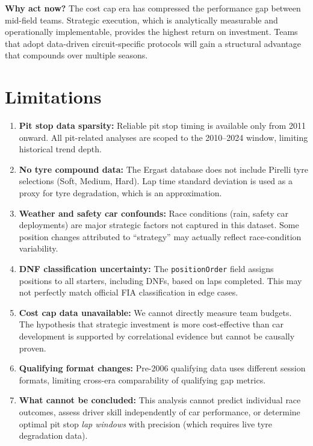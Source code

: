 \documentclass[12pt, a4paper]{article}
\begin{document}
\textbf{Why act now?} The cost cap era has compressed the performance gap between mid-field teams. Strategic execution, which is analytically measurable and operationally implementable, provides the highest return on investment. Teams that adopt data-driven circuit-specific protocols will gain a structural advantage that compounds over multiple seasons.

\newpage

\section{Limitations}

\begin{enumerate}
    \item \textbf{Pit stop data sparsity:} Reliable pit stop timing is available only from 2011 onward. All pit-related analyses are scoped to the 2010--2024 window, limiting historical trend depth.

    \item \textbf{No tyre compound data:} The Ergast database does not include Pirelli tyre selections (Soft, Medium, Hard). Lap time standard deviation is used as a proxy for tyre degradation, which is an approximation.

    \item \textbf{Weather and safety car confounds:} Race conditions (rain, safety car deployments) are major strategic factors not captured in this dataset. Some position changes attributed to ``strategy'' may actually reflect race-condition variability.

    \item \textbf{DNF classification uncertainty:} The \texttt{positionOrder} field assigns positions to all starters, including DNFs, based on laps completed. This may not perfectly match official FIA classification in edge cases.

    \item \textbf{Cost cap data unavailable:} We cannot directly measure team budgets. The hypothesis that strategic investment is more cost-effective than car development is supported by correlational evidence but cannot be causally proven.

    \item \textbf{Qualifying format changes:} Pre-2006 qualifying data uses different session formats, limiting cross-era comparability of qualifying gap metrics.

    \item \textbf{What cannot be concluded:} This analysis cannot predict individual race outcomes, assess driver skill independently of car performance, or determine optimal pit stop \textit{lap windows} with precision (which requires live tyre degradation data).
\end{enumerate}
\end{document}
